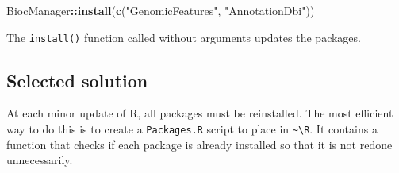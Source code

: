 \documentclass[
  12pt,
  american,
  a4paper,
  extrafontsizes,onecolumn,openright
  ]{memoir}
\newenvironment{Shaded}{\begin{snugshade}}{\end{snugshade}}
\newcommand{\FunctionTok}[1]{\textcolor[rgb]{0.13,0.29,0.53}{\textbf{#1}}}
\newcommand{\NormalTok}[1]{#1}
\newcommand{\SpecialCharTok}[1]{\textcolor[rgb]{0.81,0.36,0.00}{\textbf{#1}}}
\newcommand{\StringTok}[1]{\textcolor[rgb]{0.31,0.60,0.02}{#1}}
\begin{document}
\scriptsize

\begin{Shaded}
\begin{Highlighting}[]
\NormalTok{BiocManager}\SpecialCharTok{::}\FunctionTok{install}\NormalTok{(}\FunctionTok{c}\NormalTok{(}\StringTok{"GenomicFeatures"}\NormalTok{, }\StringTok{"AnnotationDbi"}\NormalTok{))}
\end{Highlighting}
\end{Shaded}

\normalsize

The \texttt{install()} function called without arguments updates the packages.

\subsection{Selected solution}\label{selected-solution}

At each minor update of R, all packages must be reinstalled.
The most efficient way to do this is to create a \texttt{Packages.R} script to place in \texttt{\textasciitilde{}\textbackslash{}R}.
It contains a function that checks if each package is already installed so that it is not redone unnecessarily.

\scriptsize
\end{document}
